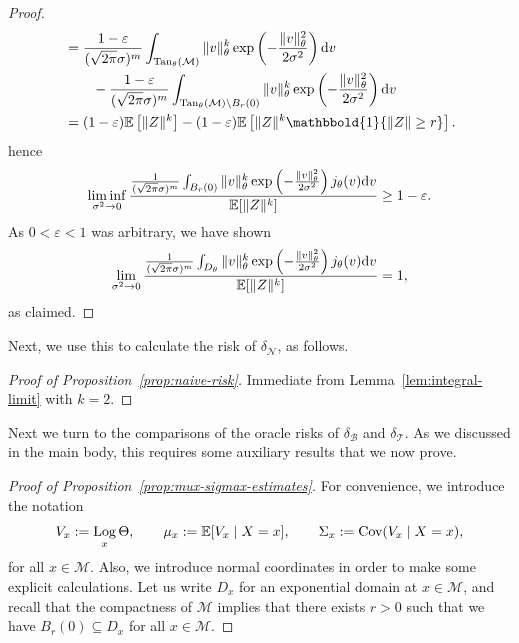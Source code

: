 \documentclass[preprint]{imsart}
\theoremstyle{plain}
\theoremstyle{definition}
\newcommand{\ind}{\mathbbold{1}}
\newcommand{\Ebb}{\mathbb{E}}
\newcommand{\Cov}{\textnormal{Cov}}
\newcommand{\Mcal}{\mathcal{M}}
\newcommand{\diff}{\textnormal{d}}
\DeclareMathOperator{\Tan}{Tan}
\newcommand{\B}{\mathcal{B}}
\newcommand{\N}{\mathcal{N}}
\newcommand{\T}{\mathcal{T}}
\DeclareMathOperator{\Log}{Log}
\begin{document}
\begin{appendix}
\begin{proof}
\begin{align*}
        &= \frac{1-\varepsilon}{(\sqrt{2\pi}\sigma)^m}\int_{\Tan_{\theta}(\Mcal)}\|v\|^k_{\theta}\exp\left(-\frac{\|v\|^2_{\theta}}{2\sigma^2}\right)\diff v \\
        &\qquad- \frac{1-\varepsilon}{(\sqrt{2\pi}\sigma)^m}\int_{\Tan_{\theta}(\Mcal)\setminus B_{r}(0)}\|v\|^k_{\theta}\exp\left(-\frac{\|v\|^2_{\theta}}{2\sigma^2}\right)\diff v \\
        &= (1-\varepsilon)\Ebb\left[\|Z\|^k\right] - (1-\varepsilon)\Ebb\left[\|Z\|^k\ind\{\|Z\|\ge r\}\right].
    \end{align*}
    hence    
     \begin{equation*}
        \liminf_{\sigma^2\to 0}\frac{\frac{1}{(\sqrt{2\pi}\sigma)^m}\int_{B_r(0)}\|v\|^k_{\theta}\exp\left(-\frac{\|v\|^2_{\theta}}{2\sigma^2}\right)j_{\theta}(v)\diff v}{\Ebb[\|Z\|^k]} \ge 1-\varepsilon.
    \end{equation*}
    As $0<\varepsilon<1$ was arbitrary, we have shown
    \begin{equation*}
        \lim_{\sigma^2\to 0}\frac{\frac{1}{(\sqrt{2\pi}\sigma)^m}\int_{D_{\theta}}\|v\|^k_{\theta}\exp\left(-\frac{\|v\|^2_{\theta}}{2\sigma^2}\right)j_{\theta}(v)\diff v}{\Ebb[\|Z\|^k]} =1,
    \end{equation*}
    as claimed.
\end{proof}

Next, we use this to calculate the risk of $\delta_{\N}$, as follows.

\begin{proof}[Proof of Proposition~\ref{prop:naive-risk}]
    Immediate from Lemma~\ref{lem:integral-limit} with $k=2$.
\end{proof}

Next we turn to the comparisons of the oracle risks of $\delta_{\B}$ and $\delta_{\T}$.
As we discussed in the main body, this requires some auxiliary results that we now prove.

\begin{proof}[Proof of Proposition~\ref{prop:mux-sigmax-estimates}]
For convenience, we introduce the notation
    \begin{equation}\label{eq:V_x}
        V_x := \Log_x \Theta, \qquad \mu_x := \Ebb[V_x \mid X=x], \qquad \Sigma_x := \Cov(V_x \mid X=x),
    \end{equation}
    for all $x\in\Mcal$.
    Also, we introduce normal coordinates in order to make some explicit calculations.
    Let us write $D_x$ for an exponential domain at $x\in\Mcal$, and recall that the compactness of $\Mcal$ implies that there exists $r>0$ such that we have $B_r(0)\subseteq D_x$ for all $x\in\Mcal$.


\end{proof}
\end{appendix}
\end{document}
